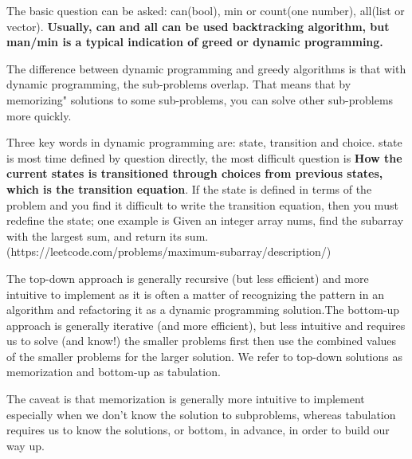 \documentclass[a4paper,11pt,twoside]{book}
\begin{document}
	\par The basic question can be asked: can(bool), min or count(one number), all(list or vector). \textbf{Usually, can and all can be used backtracking algorithm, but man/min is a typical indication of greed or dynamic programming.}
	
	\par The difference between dynamic programming and greedy algorithms is that with dynamic programming, the sub-problems overlap. That means that by memorizing" solutions to some sub-problems, you can solve other sub-problems more quickly. 
	
	\par Three key words in dynamic programming are: state, transition and choice. state is most time defined by question directly,  the most difficult question is \textbf{How the current states is transitioned through choices from previous states, which is the transition equation}. If the state is defined in terms of the problem and you find it difficult to write the transition equation, then you must redefine the state; one example is Given an integer array nums, find the 
	subarray with the largest sum, and return its sum. (https://leetcode.com/problems/maximum-subarray/description/)
	
	
	\par The top-down approach is generally recursive (but less efficient) and more intuitive to implement as it is often a matter of recognizing the pattern in an algorithm and refactoring it as a dynamic programming solution.The bottom-up approach is generally iterative (and more efficient), but less intuitive and requires us to solve (and know!) the smaller problems first then use the combined values of the smaller problems for the larger solution. We refer to top-down solutions as memorization and bottom-up as tabulation.
	
	
%	
	
	\par The caveat is that memorization is generally more intuitive to implement especially when we don’t know the solution to subproblems, whereas tabulation requires us to know the solutions, or bottom, in advance, in order to build our way up.
	
\end{document}
